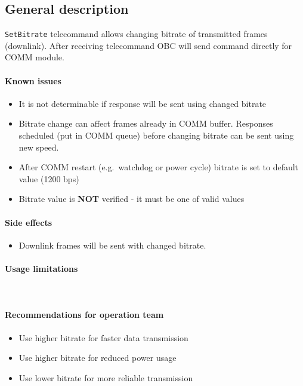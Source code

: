 

\subsection{General description}
\texttt{SetBitrate} telecommand allows changing bitrate of transmitted frames (downlink). After receiving telecommand OBC will send command directly for COMM module. 


\paragraph{Known issues}
\begin{itemize}
	\item It is not determinable if response will be sent using changed bitrate
	\item Bitrate change can affect frames already in COMM buffer. Responses scheduled (put in COMM queue) before changing bitrate can be sent using new speed.
	\item After COMM restart (e.g.\ watchdog or power cycle) bitrate is set to default value (1200 bps)
	\item Bitrate value is \textbf{NOT} verified - it must be one of valid values
\end{itemize}

\paragraph{Side effects} 
\begin{itemize}
	\item Downlink frames will be sent with changed bitrate.
\end{itemize}

\paragraph{Usage limitations} \mbox{} \\
\None

\paragraph{Recommendations for operation team}
\begin{itemize}
	\item Use higher bitrate for faster data transmission
	\item Use higher bitrate for reduced power usage
	\item Use lower bitrate for more reliable transmission
\end{itemize}

